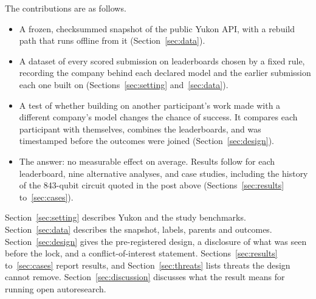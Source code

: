 The contributions are as follows.
\begin{itemize}
  \item A frozen, checksummed snapshot of the public Yukon API, with a rebuild path that runs offline from it (Section~\ref{sec:data}).
  \item A dataset of every scored submission on \StudyK{} leaderboards chosen by a fixed rule, recording the company behind each declared model and the earlier submission each one built on (Sections~\ref{sec:setting} and~\ref{sec:data}).
  \item A test of whether building on another participant's work made with a different company's model changes the chance of success. It compares each participant with themselves, combines the leaderboards, and was timestamped before the outcomes were joined (Section~\ref{sec:design}).
  \item The answer: no measurable effect on average. Results follow for each leaderboard, nine alternative analyses, and case studies, including the history of the 843-qubit circuit quoted in the post above (Sections~\ref{sec:results} to~\ref{sec:cases}).
\end{itemize}

Section~\ref{sec:setting} describes Yukon and the study benchmarks.
Section~\ref{sec:data} describes the snapshot, labels, parents and outcomes.
Section~\ref{sec:design} gives the pre-registered design, a disclosure of what was seen before the lock, and a conflict-of-interest statement.
Sections~\ref{sec:results} to~\ref{sec:cases} report results, and Section~\ref{sec:threats} lists threats the design cannot remove.
Section~\ref{sec:discussion} discusses what the result means for running open autoresearch.
